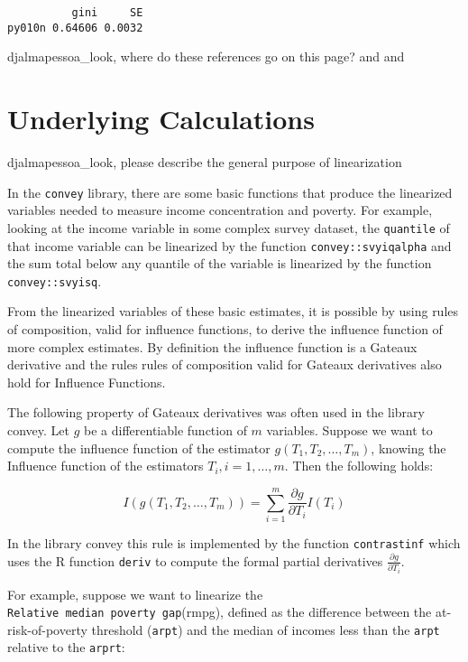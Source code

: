 \documentclass[]{book}
\begin{document}
\begin{verbatim}
          gini     SE
py010n 0.64606 0.0032
\end{verbatim}

djalmapessoa\_look, where do these references go on this page?
\citep{berger2003} and \citep{osier2009} and \citep{deville1999}

\section{Underlying Calculations}\label{underlying-calculations}

djalmapessoa\_look, please describe the general purpose of linearization

In the \texttt{convey} library, there are some basic functions that
produce the linearized variables needed to measure income concentration
and poverty. For example, looking at the income variable in some complex
survey dataset, the \texttt{quantile} of that income variable can be
linearized by the function \texttt{convey::svyiqalpha} and the sum total
below any quantile of the variable is linearized by the function
\texttt{convey::svyisq}.

From the linearized variables of these basic estimates, it is possible
by using rules of composition, valid for influence functions, to derive
the influence function of more complex estimates. By definition the
influence function is a Gateaux derivative and the rules rules of
composition valid for Gateaux derivatives also hold for Influence
Functions.

The following property of Gateaux derivatives was often used in the
library convey. Let \(g\) be a differentiable function of \(m\)
variables. Suppose we want to compute the influence function of the
estimator \(g(T_1, T_2,\ldots, T_m)\), knowing the Influence function of
the estimators \(T_i, i=1,\ldots, m\). Then the following holds:

\[
I(g(T_1, T_2,\ldots, T_m)) = \sum_{i=1}^m \frac{\partial g}{\partial T_i}I(T_i)
\]

In the library convey this rule is implemented by the function
\texttt{contrastinf} which uses the R function \texttt{deriv} to compute
the formal partial derivatives \(\frac{\partial g}{\partial T_i}\).

For example, suppose we want to linearize the
\texttt{Relative\ median\ poverty\ gap}(rmpg), defined as the difference
between the at-risk-of-poverty threshold (\texttt{arpt}) and the median
of incomes less than the \texttt{arpt} relative to the \texttt{arprt}:
\end{document}
